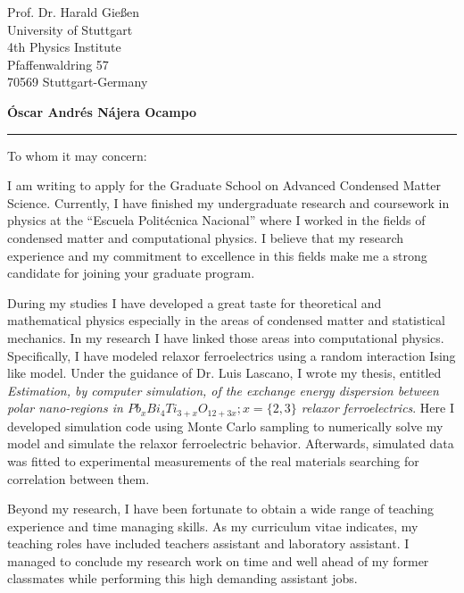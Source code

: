 \documentclass{letter}
\begin{document}
\signature{\vspace{-1.5cm}Óscar Nájera}           %
\address{Cap.Rafael Ramos E2-254 Casa \#2 \\
Quito,Ecuador\\
(+593-9) 643-9206\\
najera.oscar@gmail.com} 


\begin{letter}{Prof. Dr. Harald Gießen \\
University of Stuttgart\\
4th Physics Institute\\
Pfaffenwaldring 57\\
70569 Stuttgart-Germany}

\begin{flushleft}
{\large\bf Óscar Andrés Nájera Ocampo}
\end{flushleft}
\hrule height 1pt


\opening{To whom it may concern:}
\onehalfspacing

I am writing to apply for the Graduate School on Advanced Condensed Matter Science.
Currently, I have finished my undergraduate research and coursework in
physics at the ``Escuela Politécnica Nacional'' where I worked in the
fields of condensed matter and computational physics. I believe
that my research experience and my commitment to excellence in
this fields make me a strong candidate for joining your graduate
program.

During my studies I have developed a great taste for theoretical and
mathematical physics especially in the areas of condensed matter
and statistical mechanics. In my research I have linked those areas into
computational physics. Specifically, I have modeled relaxor
ferroelectrics using a random interaction Ising like model. Under
the guidance of Dr. Luis Lascano, I wrote my thesis, entitled
\textit{Estimation, by computer simulation, of the exchange energy
dispersion between polar nano-regions in
$Pb_xBi_4Ti_{3+x}O_{12+3x}; x=\{2,3\}$ relaxor ferroelectrics}.
Here I developed simulation code using Monte Carlo sampling to numerically
solve my model and simulate the relaxor ferroelectric behavior.
Afterwards, simulated data was fitted to experimental measurements
of the real materials searching for correlation between them.

Beyond my research, I have been fortunate to obtain a wide range
of teaching experience and time managing skills. As my curriculum
vitae indicates, my teaching roles have included teachers assistant
and laboratory assistant. I managed to conclude my research work
on time and well ahead of my former classmates while performing
this high demanding assistant jobs.


\end{letter}
\end{document}
